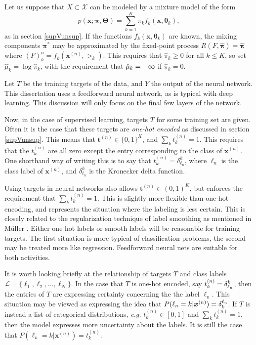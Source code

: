 Let us suppose that $X\subset\mathcal{X}$ can be modeled by a mixture model of the form
\[p(\bm x;\bm\pi,\bm\Theta)=\sum_{k=1}^{K}\pi_kf_k(\bm x,\bm\theta_k),\] as in 
section \ref{supVunsup}. If the functions  
$f_k(\bm x,\bm\theta_k)$ are known, the mixing components $\bm\pi^{\ast}$ may be approximated by the fixed-point process $R(F,\hat{\bm\pi})=\hat{\bm\pi}$ where $(F)_k^n=f_k(\bm x^{(n)},\bm\gt_k)$.
This requires that $\hat{\pi}_k\geq 0$ for all $k\leq K$, so set $\hat{\mu}_k = 
\log\hat{\pi}_k$, with the requirement that $\hat{\mu}_k=-\infty$ if $\hat{\pi}_k=0$.


Let $T$ be the training targets of the data, and $Y$ the output of the neural network.  
This dissertation uses a feedforward neural network, as is typical 
with deep learning. This discussion will only focus on the final few layers of the network.

Now, in the case of supervised learning, targets $T$ for some training set are given.  Often it is the case that these targets are \textit{one-hot encoded} as discussed in section \ref{supVunsup}.
This means that $\bm t^{(n)}\in \{0,1\}^{K}$, and $\sum_k t_k^{(n)} = 1$.  This requires
that the $t_k^{(n)}$ are all zero except the entry corresponding to the class of $\bm
x^{(n)}$.  One shorthand way of writing this is to say that $t_k^{(n)}=\delta_{\ell_n}^k
$, where $\ell_n$ is the class label of $\bm x^{(n)}$, and $\delta_{\ell_n}^k$ is the 
Kronecker delta function. 

Using targets in neural networks also allows $\bm t^{(n)}\in (0,1)^{K}$, but enforces the requirement that $\sum_k t_k^{(n)} = 1$.  This is slightly more flexible than one-hot encoding, and represents the situation where the labeling is less certain. This is closely related to the regularization technique of label smoothing as mentioned in M\"uller \cite{muller2019labelsmoothing}.  Either one hot labels or smooth labels will be reasonable for training targets.  The first situation is more typical of classification problems, the second may be treated more like regression.  Feedforward neural nets are suitable for both activities.

It is worth looking briefly at the relationship of targets $T$ and class labels 
\(\mathcal{L}=\{\ell_1, \ell_2,\ldots,\ell_N\}\).  In the case that $T$ is one-hot encoded,
say $t_k^{(n)}=\delta_{\ell_n}^k$, then the entries of $T$ are expressing certainty
concerning the the label $\ell_n$. This situation may be viewed as expressing the idea
that $P(\ell_n = k|\bm x^{(n)}) = \delta_k^{\ell_n}$. If $T$ is instead a list of categorical distributions, \textit{e.g.} $t_k^{(n)}\in [0,1]$ and $\sum_k t_k^{(n)} = 1$, then the model expresses more uncertainty about the labels. It is still the case that $P(\ell_n = k|\bm x^{(n)}) = t_k^{(n)}$. 

